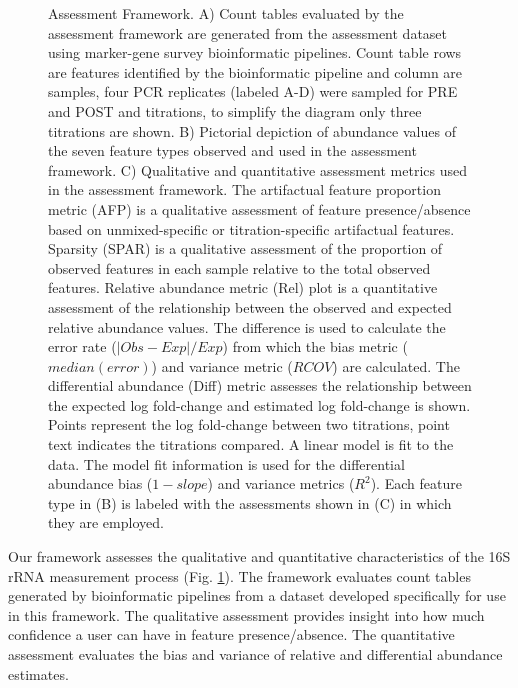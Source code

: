\documentclass[linenumbers]{bmcart}
\begin{document}
\begin{figure}
\caption{\label{fig:assessmentFramework}Assessment Framework. A) Count tables evaluated by the assessment framework are generated from the assessment dataset using marker-gene survey bioinformatic pipelines. Count table rows are features identified by the bioinformatic pipeline and column are samples, four PCR replicates (labeled A-D) were sampled for PRE and POST and titrations, to simplify the diagram only three titrations are shown. B) Pictorial depiction of abundance values of the seven feature types observed and used in the assessment framework. C) Qualitative and quantitative assessment metrics used in the assessment framework. The artifactual feature proportion metric (AFP) is a qualitative assessment of feature presence/absence based on unmixed-specific or titration-specific artifactual features. Sparsity (SPAR) is a qualitative assessment of the proportion of observed features in each sample relative to the total observed features. Relative abundance metric (Rel) plot is a quantitative assessment of the relationship between the observed and expected relative abundance values. The difference is used to calculate the error rate ($|Obs-Exp|/Exp$) from which the bias metric ($median(error)$) and variance metric ($RCOV$) are calculated. The differential abundance (Diff) metric assesses the relationship between the expected log fold-change and estimated log fold-change is shown. Points represent the log fold-change between two titrations, point text indicates the titrations compared. A linear model is fit to the data. The model fit information is used for the differential abundance bias ($1-slope$) and variance metrics ($R^2$). Each feature type in (B) is labeled with the assessments shown in (C) in which they are employed.}
\end{figure}

Our framework assesses the qualitative and quantitative characteristics of the 16S rRNA measurement process (Fig. \ref{fig:assessmentFramework}).
The framework evaluates count tables generated by bioinformatic pipelines from a dataset developed specifically for use in this framework.
The qualitative assessment provides insight into how much confidence a user can have in feature  presence/absence.
The quantitative assessment evaluates the bias and variance of relative and differential abundance estimates.
\end{document}
